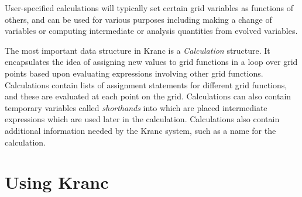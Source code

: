 \documentclass{report}
\begin{document}
User-specified calculations will typically set certain grid variables
as functions of others, and can be used for various purposes including
making a change of variables or computing intermediate or analysis
quantities from evolved variables.

The most important data structure in Kranc is a {\em Calculation}
structure.  It encapsulates the idea of assigning new values to grid
functions in a loop over grid points based upon evaluating expressions
involving other grid functions.  Calculations contain lists of
assignment statements for different grid functions, and these are
evaluated at each point on the grid.  Calculations can also contain
temporary variables called {\em shorthands} into which are placed
intermediate expressions which are used later in the
calculation.  Calculations also contain additional information needed
by the Kranc system, such as a name for the calculation.

\chapter{Using Kranc}



\end{document}
